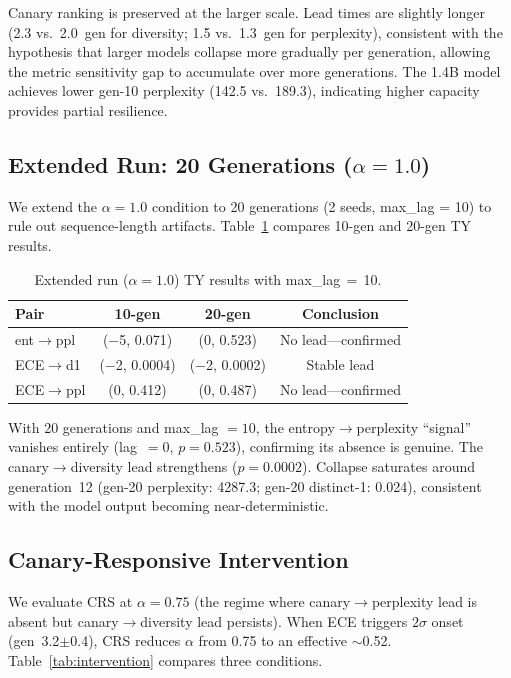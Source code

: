 \documentclass[letterpaper,11pt]{article}
\begin{document}
Canary ranking is preserved at the larger scale. Lead times are slightly longer (2.3 vs.\ 2.0~gen for diversity; 1.5 vs.\ 1.3~gen for perplexity), consistent with the hypothesis that larger models collapse more gradually per generation, allowing the metric sensitivity gap to accumulate over more generations. The 1.4B model achieves lower gen-10 perplexity (142.5 vs.\ 189.3), indicating higher capacity provides partial resilience.

\subsection{Extended Run: 20 Generations ($\alpha = 1.0$)}
\label{sec:extended}

We extend the $\alpha = 1.0$ condition to 20 generations (2 seeds, max\_lag = 10) to rule out sequence-length artifacts. Table~\ref{tab:extended} compares 10-gen and 20-gen TY results.

\begin{table}[t]
\centering
\caption{Extended run ($\alpha\!=\!1.0$) TY results with max\_lag$\,=\,$10.}
\label{tab:extended}
\small
\begin{tabular}{@{}lccc@{}}
\toprule
Pair & 10-gen & 20-gen & Conclusion \\
\midrule
ent$\to$ppl  & ($-$5, 0.071) & (0, 0.523) & No lead---confirmed \\
ECE$\to$d1   & ($-$2, 0.0004) & ($-$2, 0.0002) & Stable lead \\
ECE$\to$ppl  & (0, 0.412) & (0, 0.487)       & No lead---confirmed \\
\bottomrule
\end{tabular}
\end{table}

With 20 generations and max\_lag $= 10$, the entropy$\to$perplexity ``signal'' vanishes entirely (lag~$= 0$, $p = 0.523$), confirming its absence is genuine. The canary$\to$diversity lead strengthens ($p = 0.0002$). Collapse saturates around generation~12 (gen-20 perplexity: 4287.3; gen-20 distinct-1: 0.024), consistent with the model output becoming near-deterministic.

\subsection{Canary-Responsive Intervention}
\label{sec:intervention}

We evaluate CRS at $\alpha = 0.75$ (the regime where canary$\to$perplexity lead is absent but canary$\to$diversity lead persists). When ECE triggers $2\sigma$ onset (gen~3.2$\pm$0.4), CRS reduces $\alpha$ from 0.75 to an effective $\sim$0.52. Table~\ref{tab:intervention} compares three conditions.
\end{document}
